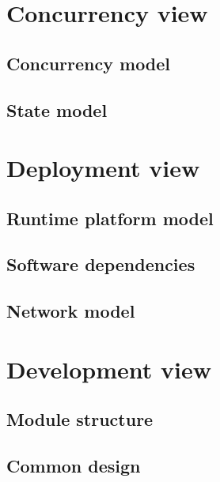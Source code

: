 \documentclass[a4paper,11pt]{report}
\begin{document}
\section{Concurrency view}
\label{sec:concurrency-view}


\subsection{Concurrency model}
\label{sec:concurrency-model}


\subsection{State model}
\label{sec:state-model}


\section{Deployment view}
\label{sec:deployment-view}


\subsection{Runtime platform model}
\label{sec:runt-platf-model}



\subsection{Software dependencies}
\label{sec:softw-depend}


\subsection{Network model}
\label{sec:network-model}


\section{Development view}
\label{sec:development-view}


\subsection{Module structure}
\label{sec:module-structure}


\subsection{Common design}
\label{sec:common-design}
\end{document}
